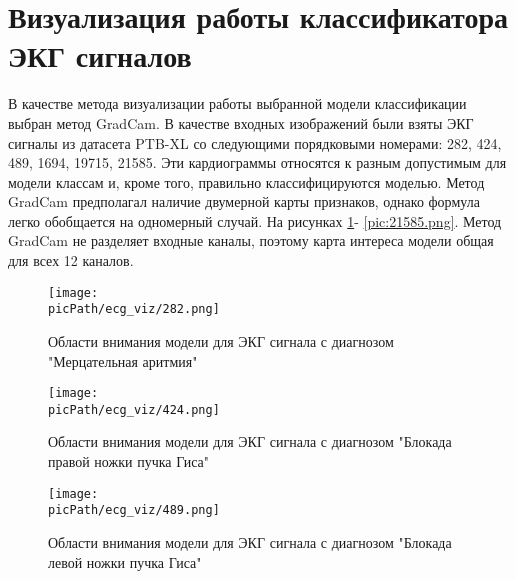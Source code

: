 \documentclass[oneside,final,14pt]{extreport}
\newcommand{\picPath}{img}
\begin{document}
\section{Визуализация работы классификатора ЭКГ сигналов}\label{sec:conv_grad_cam}
В качестве метода визуализации работы выбранной модели классификации выбран метод GradCam. В качестве входных изображений были взяты ЭКГ сигналы из датасета PTB-XL со следующими порядковыми номерами: 282, 424, 489, 1694, 19715, 21585. Эти кардиограммы относятся к разным  допустимым для модели классам и, кроме того, правильно классифицируются моделью. Метод GradCam предполагал наличие двумерной карты признаков, однако формула легко обобщается на одномерный случай. На рисунках   \ref{pic:282.png}- \ref{pic:21585.png}. Метод GradCam не разделяет входные каналы, поэтому карта интереса модели общая для всех 12 каналов. 

\begin{figure}[H]
\begin{center}
\texttt{[image: \\picPath/ecg\_viz/282.png]}
\end{center}
  \caption{Области внимания модели для ЭКГ сигнала с диагнозом "Мерцательная аритмия"}
  \label{pic:282.png}
\end{figure}
\newpage
\begin{figure}[H]
\begin{center}
\texttt{[image: \\picPath/ecg\_viz/424.png]}
\end{center}
  \caption{Области внимания модели для ЭКГ сигнала с диагнозом "Блокада правой ножки пучка Гиса"}

\end{figure}
\newpage
\begin{figure}[H]
\begin{center}
\texttt{[image: \\picPath/ecg\_viz/489.png]}
\end{center}
  \caption{Области внимания модели для ЭКГ сигнала с диагнозом "Блокада левой ножки пучка Гиса"}

\end{figure}
\newpage
\end{document}
